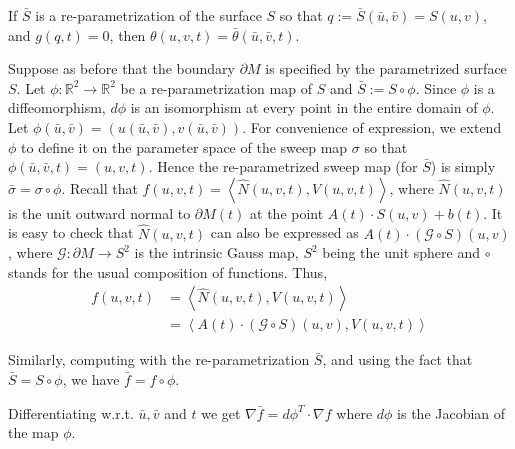 \documentclass{elsart5p}
\newcommand{\eat}[1]{}
\begin{document}
\begin{thm} \label{thetaInvarThm}
If $\bar{S}$ is a re-parametrization of the surface $S$ so that $q:=\bar{S}(\bar{u}, \bar{v}) = S(u,v)$, and $g(q,t)=0$, then $\theta(u,v,t) = \bar{\theta}(\bar{u}, \bar{v}, t)$.
\end{thm}
Suppose as before that the boundary $\partial M$ is specified by the parametrized surface $S$.  Let $\phi: \mathbb{R}^2 \to \mathbb{R}^2$ be a re-parametrization map of $S$ and 
$\bar{S} := S \circ \phi$.  Since $\phi$ is a diffeomorphism, $d\phi$ is an isomorphism at every point in the entire domain of $\phi$.  Let $\phi(\bar{u}, \bar{v}) = (u(\bar{u}, \bar{v}), v(\bar{u}, \bar{v}))$.  
For convenience of expression, we extend $\phi$ to define it on the parameter space of the sweep map $\sigma$ so that $\phi(\bar{u}, \bar{v}, t) = (u,v,t)$.  Hence the re-parametrized 
sweep map (for $\bar{S}$) is simply $\bar{\sigma} = \sigma \circ \phi$.  Recall that $f(u,v,t) = \left < \hat{N}(u,v,t), V(u,v,t) \right>$,
 where $\hat{N}(u,v,t)$ is the unit outward normal to $\partial M(t)$ at 
 the point $A(t)\cdot S(u,v)+b(t)$. It is easy to check that $\hat{N}(u,v,t)$ 
 can also be expressed as $A(t) \cdot (\mathcal{G} \circ S)(u,v)$, where 
$\mathcal{G}:\partial M \to S^2$ is the intrinsic Gauss map, $S^2$ being the unit sphere  
and $\circ$ stands for the usual composition of functions.
Thus, 
\begin{align*}
f(u,v,t) & = \left < \hat{N}(u, v, t), V(u, v, t) \right > \\
& = \left< A(t) \cdot (\mathcal{G} \circ S)(u, v) , V(u,v,t) \right >
\end{align*}

Similarly, computing with the re-parametrization $\bar{S}$, and using
the fact that $\bar{S}=S \circ \phi$, we have $\bar{f}=f \circ \phi$.
\eat{
\begin{align*}
\bar{f}(\bar{u}, \bar{v},t) & = \left < \bar{\hat{N}}(\bar{u}, \bar{v}, t), V(\bar{u}, \bar{v}, t) \right > \\
& = \left< A(t) (\mathcal{G} \circ \bar{S}) (\bar{u}, \bar{v}) , V(\bar{u}, \bar{v}, t) \right >
\end{align*}
}
Differentiating w.r.t. $\bar{u}, \bar{v}$ and $t$ we get
$\nabla \bar{f} = d\phi^T \cdot \nabla f$
where $d\phi$ is the Jacobian of the map $\phi$.
\eat{$d\phi = \begin{bmatrix} u_{\bar{u}} & u_{\bar{v}} & 0 \\ v_{\bar{u}} & v_{\bar{v}} & 0 \\ 0 & 0 & 1 \end{bmatrix}$. } 
\end{document}
